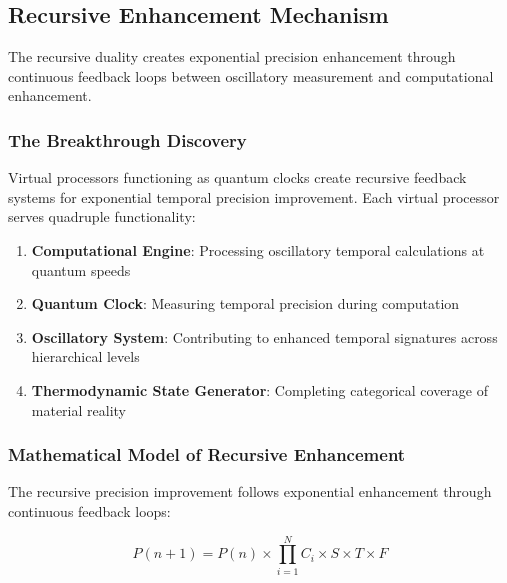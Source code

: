 \documentclass[12pt,a4paper]{article}
\begin{document}
\subsection{Recursive Enhancement Mechanism}

The recursive duality creates exponential precision enhancement through continuous feedback loops between oscillatory measurement and computational enhancement.

\subsubsection{The Breakthrough Discovery}

Virtual processors functioning as quantum clocks create recursive feedback systems for exponential temporal precision improvement. Each virtual processor serves quadruple functionality:

\begin{enumerate}
\item \textbf{Computational Engine}: Processing oscillatory temporal calculations at quantum speeds
\item \textbf{Quantum Clock}: Measuring temporal precision during computation
\item \textbf{Oscillatory System}: Contributing to enhanced temporal signatures across hierarchical levels
\item \textbf{Thermodynamic State Generator}: Completing categorical coverage of material reality
\end{enumerate}

\subsubsection{Mathematical Model of Recursive Enhancement}

The recursive precision improvement follows exponential enhancement through continuous feedback loops:

\begin{equation}
P(n+1) = P(n) \times \prod_{i=1}^{N} C_i \times S \times T \times F
\end{equation}
\end{document}
